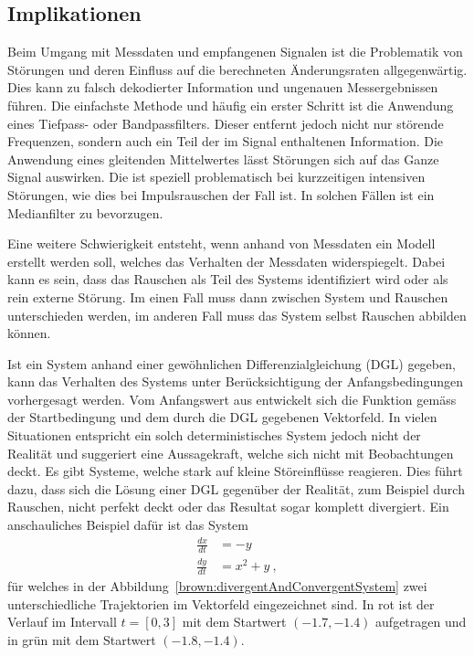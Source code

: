 \subsection{Implikationen\label{brown:Rauschen:Implikationen}}

Beim Umgang mit Messdaten und empfangenen Signalen ist die Problematik von Störungen und deren Einfluss auf die berechneten Änderungsraten allgegenwärtig. Dies  kann zu falsch dekodierter Information und ungenauen Messergebnissen führen. Die einfachste Methode und häufig ein erster Schritt ist die Anwendung eines Tiefpass- oder Bandpassfilters. Dieser entfernt jedoch nicht nur störende Frequenzen, sondern auch ein Teil der im Signal enthaltenen Information. Die Anwendung eines gleitenden Mittelwertes lässt Störungen sich auf das Ganze Signal auswirken. Die ist speziell problematisch bei kurzzeitigen intensiven Störungen, wie dies bei Impulsrauschen der Fall ist. In solchen Fällen ist ein Medianfilter zu bevorzugen.

Eine weitere Schwierigkeit entsteht, wenn anhand von Messdaten ein Modell erstellt werden soll, welches das Verhalten der Messdaten widerspiegelt. Dabei kann es sein, dass das Rauschen als Teil des Systems identifiziert wird oder als rein externe Störung. Im einen Fall muss dann zwischen System und Rauschen unterschieden werden, im anderen Fall muss das System selbst Rauschen abbilden können.

Ist ein System anhand einer gewöhnlichen Differenzialgleichung (DGL) gegeben, kann das Verhalten des Systems unter Berücksichtigung der Anfangsbedingungen vorhergesagt werden. Vom Anfangswert aus entwickelt sich die Funktion gemäss der Startbedingung und dem durch die DGL gegebenen Vektorfeld. In vielen Situationen entspricht ein solch deterministisches System jedoch nicht der Realität und suggeriert eine Aussagekraft, welche sich nicht mit Beobachtungen deckt. Es gibt Systeme, welche stark auf kleine Störeinflüsse reagieren. Dies führt dazu, dass sich die Lösung einer DGL gegenüber der Realität, zum Beispiel durch Rauschen, nicht perfekt deckt oder das Resultat sogar komplett divergiert. Ein anschauliches Beispiel dafür ist das System
\begin{align}
	\frac{dx}{dt} &= -y \\
	\frac{dy}{dt} &= x^2 + y
	\label{brown:divergentEquation} \ ,
\end{align}
für welches in der Abbildung~\ref{brown:divergentAndConvergentSystem} zwei unterschiedliche Trajektorien im Vektorfeld eingezeichnet sind. In rot ist der Verlauf im Intervall  $ t = [0, 3] $ mit dem Startwert $ (-1.7, -1.4) $ aufgetragen und in grün mit dem Startwert $ (-1.8, -1.4) $.

